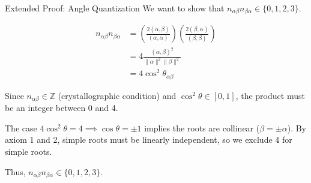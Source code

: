 \begin{frame}[label=backup_proof]{Extended Proof: Angle Quantization}
    We want to show that $n_{\alpha\beta} n_{\beta\alpha} \in \{0, 1, 2, 3\}$.

    \begin{align*}
        n_{\alpha\beta} n_{\beta\alpha} & = \left( \frac{2(\alpha, \beta)}{(\alpha, \alpha)} \right) \left( \frac{2(\beta, \alpha)}{(\beta, \beta)} \right) \\
                                        & = 4 \frac{(\alpha, \beta)^2}{\|\alpha\|^2 \|\beta\|^2}                                                            \\
                                        & = 4 \cos^2 \theta_{\alpha\beta}
    \end{align*}

    Since $n_{\alpha\beta} \in \mathbb{Z}$ (crystallographic condition) and $\cos^2 \theta \in [0,1]$, the product must be an integer between 0 and 4.

    The case $4 \cos^2 \theta = 4 \implies \cos \theta = \pm 1$ implies the roots are collinear ($\beta = \pm \alpha$). By axiom 1 and 2, simple roots must be linearly independent, so we exclude 4 for simple roots.

    Thus, $n_{\alpha\beta} n_{\beta\alpha} \in \{0, 1, 2, 3\}$.
\end{frame}
